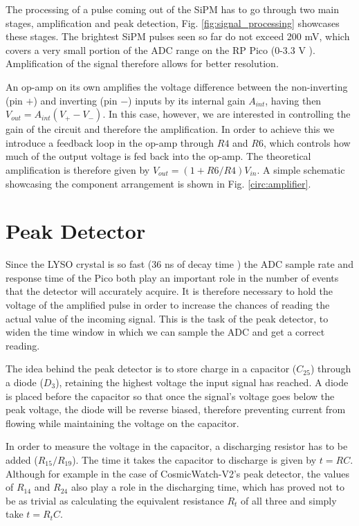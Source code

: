 The processing of a pulse coming out of the SiPM has to go through two main stages, amplification and peak detection, Fig. \ref{fig:signal_processing} showcases these stages. The brightest SiPM pulses seen so far do not exceed 200 mV, which covers a very small portion of the ADC range on the RP Pico (0-3.3 V \cite[p.~18]{datasheet2024rp2040}). Amplification of the signal therefore allows for better resolution.

An op-amp on its own amplifies the voltage difference between the non-inverting (pin $+$) and inverting (pin $-$) inputs by its internal gain $A_{int}$, having then $V_{out}=A_{int}(V_+ - V_-)$. In this case, however, we are interested in controlling the gain of the circuit and therefore the amplification. In order to achieve this we introduce a feedback loop in the op-amp through $R4$ and $R6$, which controls how much of the output voltage is fed back into the op-amp. The theoretical amplification is therefore given by $V_{out}=(1+R6/R4)V_{in}$. A simple schematic showcasing the component arrangement is shown in Fig. \ref{circ:amplifier}.

\section{Peak Detector}

Since the LYSO crystal is so fast (36 ns of decay time \cite{Luxium_LYSO}) the ADC sample rate and response time of the Pico both play an important role in the number of events that the detector will accurately acquire. It is therefore necessary to hold the voltage of the amplified pulse in order to increase the chances of reading the actual value of the incoming signal. This is the task of the peak detector, to widen the time window in which we can sample the ADC and get a correct reading.

The idea behind the peak detector is to store charge in a capacitor ($C_{25}$) through a diode ($D_3$), retaining the highest voltage the input signal has reached. A diode is placed before the capacitor so that once the signal's voltage goes below the peak voltage, the diode will be reverse biased, therefore preventing current from flowing while maintaining the voltage on the capacitor.

In order to measure the voltage in the capacitor, a discharging resistor has to be added ($R_{15}/R_{19}$). The time it takes the capacitor to discharge is given by $t=RC$. Although for example in the case of CosmicWatch-V2's peak detector, the values of $R_{14}$ and $R_{24}$ also play a role in the discharging time, which has proved not to be as trivial as calculating the equivalent resistance $R_t$ of all three and simply take $t=R_tC$.

